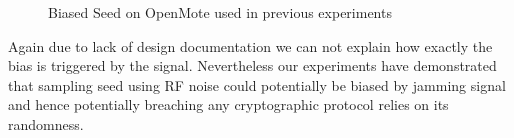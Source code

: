\begin{figure}[!t]
\centering
{}
\hfil
{}
\caption{Biased Seed on OpenMote used in previous experiments}
\label{StronglyBiased}
\end{figure}

Again due to lack of design documentation we can not explain how exactly the bias is triggered by the signal. Nevertheless our experiments have demonstrated that sampling seed using RF noise could potentially be biased by jamming signal and hence potentially breaching any cryptographic protocol relies on its randomness.